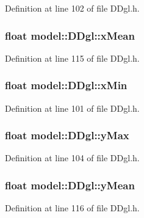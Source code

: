 Definition at line 102 of file D\+Dgl.\+h.

\hypertarget{structmodel_1_1_d_dgl_af8bbc01276094925cacd496bfaaf32bd}{}
\subsubsection[{x\+Mean}]{\setlength{\rightskip}{0pt plus 5cm}float model\+::\+D\+Dgl\+::x\+Mean}\label{structmodel_1_1_d_dgl_af8bbc01276094925cacd496bfaaf32bd}


Definition at line 115 of file D\+Dgl.\+h.

\hypertarget{structmodel_1_1_d_dgl_a506340e0a66380433e3ca1e4f9d8f95e}{}
\subsubsection[{x\+Min}]{\setlength{\rightskip}{0pt plus 5cm}float model\+::\+D\+Dgl\+::x\+Min}\label{structmodel_1_1_d_dgl_a506340e0a66380433e3ca1e4f9d8f95e}


Definition at line 101 of file D\+Dgl.\+h.

\hypertarget{structmodel_1_1_d_dgl_a80d31e53bf364c759dc006cbac96eec2}{}
\subsubsection[{y\+Max}]{\setlength{\rightskip}{0pt plus 5cm}float model\+::\+D\+Dgl\+::y\+Max}\label{structmodel_1_1_d_dgl_a80d31e53bf364c759dc006cbac96eec2}


Definition at line 104 of file D\+Dgl.\+h.

\hypertarget{structmodel_1_1_d_dgl_a6fe1a3560c4445889102963e9d65625d}{}
\subsubsection[{y\+Mean}]{\setlength{\rightskip}{0pt plus 5cm}float model\+::\+D\+Dgl\+::y\+Mean}\label{structmodel_1_1_d_dgl_a6fe1a3560c4445889102963e9d65625d}


Definition at line 116 of file D\+Dgl.\+h.

